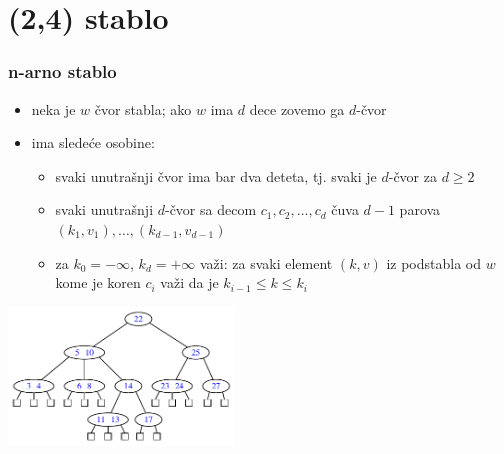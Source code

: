 \documentclass[compress,aspectratio=169]{beamer}
\begin{document}
\section[(2,4) stablo]{(2,4) stablo}
\begin{frame}[fragile]
  \frametitle{n-arno stablo}
  \begin{itemize}
    \item neka je $w$ čvor stabla; ako $w$ ima $d$ dece zovemo ga $d$-čvor
    \item {} ima sledeće osobine:
    \begin{itemize}
      \item svaki unutrašnji čvor ima bar dva deteta, tj. svaki je $d$-čvor za $d\geq 2$
      \item svaki unutrašnji $d$-čvor sa decom $c_1, c_2, \ldots, c_d$ čuva $d-1$ parova $(k_1,v_1), \ldots, (k_{d-1},v_{d-1})$
      \item za $k_0=-\infty$, $k_d=+\infty$ važi: za svaki element $(k,v)$ iz podstabla od $w$ kome je koren $c_i$ važi da je $k_{i-1}\leq k\leq k_{i}$ 
    \end{itemize}
  \end{itemize}
  \begin{center}
    \includegraphics[width=6cm]{asp-11-pic27.pdf}
  \end{center}
\end{frame}
\end{document}
